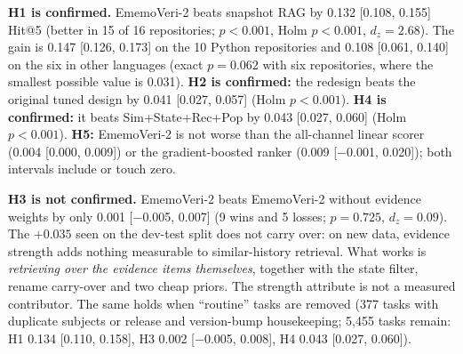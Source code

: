 \documentclass[runningheads]{llncs}
\newcommand{\sys}{EmemoVeri}
\begin{document}
\textbf{H1 is confirmed.} \sys{}-2 beats snapshot RAG by 0.132 [0.108, 0.155] Hit@5 (better in 15 of 16 repositories; $p<0.001$, Holm $p<0.001$, $d_z=2.68$). The gain is 0.147 [0.126, 0.173] on the 10 Python repositories and 0.108 [0.061, 0.140] on the six in other languages (exact $p=0.062$ with six repositories, where the smallest possible value is 0.031). \textbf{H2 is confirmed:} the redesign beats the original tuned design by 0.041 [0.027, 0.057] (Holm $p<0.001$). \textbf{H4 is confirmed:} it beats Sim+State+Rec+Pop by 0.043 [0.027, 0.060] (Holm $p<0.001$). \textbf{H5:} \sys{}-2 is not worse than the all-channel linear scorer (0.004 [0.000, 0.009]) or the gradient-boosted ranker (0.009 [$-$0.001, 0.020]); both intervals include or touch zero.

\textbf{H3 is not confirmed.} \sys{}-2 beats \sys{}-2 without evidence weights by only 0.001 [$-$0.005, 0.007] (9 wins and 5 losses; $p=0.725$, $d_z=0.09$). The $+0.035$ seen on the dev-test split does not carry over: on new data, evidence strength adds nothing measurable to similar-history retrieval. What works is \emph{retrieving over the evidence items themselves}, together with the state filter, rename carry-over and two cheap priors. The strength attribute is not a measured contributor. The same holds when ``routine'' tasks are removed (377 tasks with duplicate subjects or release and version-bump housekeeping; 5{,}455 tasks remain: H1 0.134 [0.110, 0.158], H3 0.002 [$-$0.005, 0.008], H4 0.043 [0.027, 0.060]).

\begin{table}[t]\centering\footnotesize\setlength{\tabcolsep}{4pt}
\resizebox{\linewidth}{!}{}
\caption{All systems, frozen, on the 16 fresh repositories (macro-average over repositories; koa is at ceiling for every system), and Hit@5 on the other sets. Held-out and multi-language results are post hoc for \sys{}-2.}
\label{tab:systems}
\end{table}

\begin{table}[t]\centering\footnotesize\setlength{\tabcolsep}{4pt}
\resizebox{\linewidth}{!}{}
\caption{Contrasts stated in advance, fresh set (unit: repository, $n=16$). W/L: repositories where \sys{}-2 is better / worse (ties omitted). Last columns: $\Delta$Hit@5 on the 10 Python and the 6 other-language repositories. With 16 repositories the smallest exact $p$ is $3\times10^{-5}$.}
\label{tab:contrasts}
\end{table}
\end{document}
